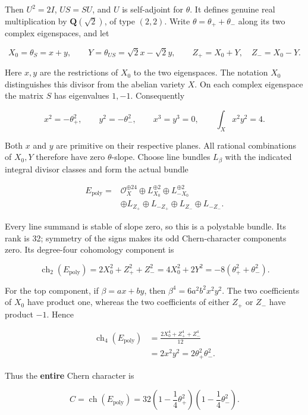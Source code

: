Then \(U^2=2I\), \(US=SU\), and \(U\) is self-adjoint for \(\theta\). It
defines genuine real multiplication by \(\mathbf Q(\sqrt2)\), of type
\((2,2)\). Write \(\theta=\theta_++\theta_-\) along its two complex
eigenspaces, and let

\[
 X_0=\theta_S=x+y,\qquad Y=\theta_{US}=\sqrt2x-\sqrt2y,
 \qquad Z_+=X_0+Y,\quad Z_-=X_0-Y.
 \tag{E815.2}
\]

Here \(x,y\) are the restrictions of \(X_0\) to the two eigenspaces. The
notation \(X_0\) distinguishes this divisor from the abelian variety
\(X\). On each complex eigenspace the matrix \(S\) has eigenvalues
\(1,-1\). Consequently

\[
 x^2=-\theta_+^2,\qquad y^2=-\theta_-^2,
 \qquad x^3=y^3=0,
 \qquad \int_Xx^2y^2=4.
 \tag{E815.3}
\]

Both \(x\) and \(y\) are primitive on their respective planes. All
rational combinations of \(X_0,Y\) therefore have zero \(\theta\)-slope.
Choose line bundles \(L_\beta\) with the indicated integral divisor
classes and form the actual bundle

\[
 \begin{split}
 E_{\mathrm{poly}}={}&\mathcal O_X^{\oplus24}
 \oplus L_{X_0}^{\oplus2}\oplus L_{-X_0}^{\oplus2}\\
 &\oplus L_{Z_+}\oplus L_{-Z_+}
 \oplus L_{Z_-}\oplus L_{-Z_-}.
 \end{split}
 \tag{E815.4}
\]

Every line summand is stable of slope zero, so this is a polystable
bundle. Its rank is 32; symmetry of the signs makes its odd
Chern-character components zero. Its degree-four cohomology component is

\[
 \operatorname{ch}_2(E_{\mathrm{poly}})
 =2X_0^2+Z_+^2+Z_-^2
 =4X_0^2+2Y^2
 =-8(\theta_+^2+\theta_-^2).
 \tag{E815.5}
\]

For the top component, if \(\beta=ax+by\), then
\(\beta^4=6a^2b^2x^2y^2\). The two coefficients of \(X_0\) have product
one, whereas the two coefficients of either \(Z_+\) or \(Z_-\) have
product \(-1\). Hence

\[
 \begin{split}
 \operatorname{ch}_4(E_{\mathrm{poly}})
 &=\frac{2X_0^4+Z_+^4+Z_-^4}{12}\\
 &=2x^2y^2=2\theta_+^2\theta_-^2.
 \end{split}
 \tag{E815.6}
\]

Thus the \textbf{entire} Chern character is

\[
 C=\operatorname{ch}(E_{\mathrm{poly}})
   =32\left(1-\frac14\theta_+^2\right)
       \left(1-\frac14\theta_-^2\right).
 \tag{E815.7}
\]


